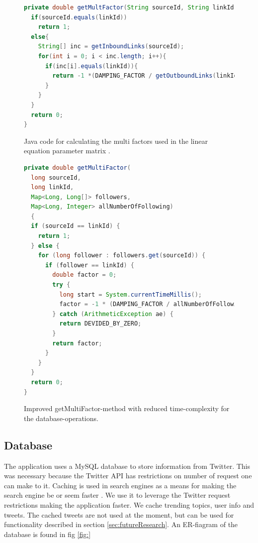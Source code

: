 \begin{figure}[h!]
\begin{lstlisting}[language=java]
private double getMultFactor(String sourceId, String linkId){ 
  if(sourceId.equals(linkId)) 
    return 1;
  else{
    String[] inc = getInboundLinks(sourceId); 
    for(int i = 0; i < inc.length; i++){ 
      if(inc[i].equals(linkId)){ 
        return -1 *(DAMPING_FACTOR / getOutboundLinks(linkId).length);
      } 
    }
  } 
  return 0;
}
\end{lstlisting}
\caption{Java code for calculating the multi factors used in the linear equation parameter matrix \protect \cite{Goodrarzi2009}.}
\label{fig:getmultifactor}
\end{figure}

\begin{figure}[h!]
\begin{lstlisting}[language=java]
private double getMultiFactor(
  long sourceId, 
  long linkId, 
  Map<Long, Long[]> followers, 
  Map<Long, Integer> allNumberOfFollowing) 
  {
  if (sourceId == linkId) {
    return 1;
  } else {
    for (long follower : followers.get(sourceId)) {
      if (follower == linkId) {
        double factor = 0;
        try {
          long start = System.currentTimeMillis();
          factor = -1 * (DAMPING_FACTOR / allNumberOfFollowing.get(linkId));
        } catch (ArithmeticException ae) {
          return DEVIDED_BY_ZERO;
        }
        return factor;
      }
    }
  }
  return 0;
}
\end{lstlisting}
\caption{Improved getMultiFactor-method with reduced time-complexity for the database-operations.}
\label{fig:getmultifactorimproved}
\end{figure}

\subsection{Database} %
\label{sec:feedJamDatabase}
The application uses a MySQL database to store information from Twitter. This was necessary because the Twitter API has restrictions on number of request one can make to it. Caching is used in search engines as a means for making the search engine be or seem faster \citep{boka}. We use it to leverage the Twitter request restrictions making the application faster. We cache trending topics, user info and tweets. The cached tweets are not used at the moment, but can be used for functionality described in  section \ref{sec:futureResearch}. An ER-fiagram of the database is found in fig \ref{fig:}

